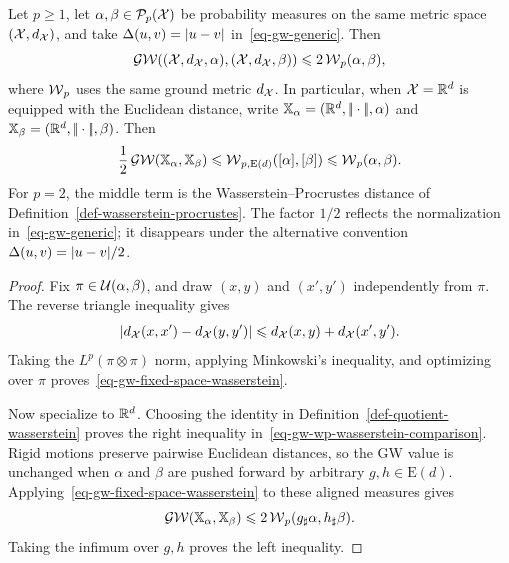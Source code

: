 \begin{prop}\label{prop-gw-wasserstein-procrustes-comparison}\label{prop-gw-controlled-by-wasserstein}\label{prop-gw-procrustes-upper-certificate}
	Let $p\geq1$, let $\alpha,\beta\in\mathcal{P}_p(\mathcal{X})$ be probability measures on the same metric space $(\mathcal{X},d_{\mathcal{X}})$, and take $\Delta(u,v)=|u-v|$ in~\eqref{eq-gw-generic}. Then
	\begin{equation}\label{eq-gw-fixed-space-wasserstein}
		\operatorname{\mathcal{GW}}((\mathcal{X},d_{\mathcal{X}},\alpha),(\mathcal{X},d_{\mathcal{X}},\beta))
		\leqslant
		2\operatorname{\mathcal{W}}_p(\alpha,\beta),
	\end{equation}
	where $\operatorname{\mathcal{W}}_p$ uses the same ground metric $d_{\mathcal{X}}$. In particular, when $\mathcal{X}=\mathbb{R}^d$ is equipped with the Euclidean distance, write $\mathbb{X}_\alpha=(\mathbb{R}^d,|\!| \cdot |\!|,\alpha)$ and $\mathbb{X}_\beta=(\mathbb{R}^d,|\!| \cdot |\!|,\beta)$. Then
	\begin{equation}\label{eq-gw-wp-wasserstein-comparison}
		\frac12\operatorname{\mathcal{GW}}(\mathbb{X}_\alpha,\mathbb{X}_\beta)
		\leqslant
		\operatorname{\mathcal{W}}_{p,\mathrm E(d)}([\alpha],[\beta])
		\leqslant
		\operatorname{\mathcal{W}}_p(\alpha,\beta).
	\end{equation}
	For $p=2$, the middle term is the Wasserstein--Procrustes distance of Definition~\ref{def-wasserstein-procrustes}. The factor $1/2$ reflects the normalization in~\eqref{eq-gw-generic}; it disappears under the alternative convention $\Delta(u,v)=|u-v|/2$.
\end{prop}
\begin{proof}
	Fix $\pi\in\mathcal{U}(\alpha,\beta)$, and draw $(x,y)$ and $(x',y')$ independently from $\pi$. The reverse triangle inequality gives
	\[
		\left\lvert d_{\mathcal{X}}(x,x')-d_{\mathcal{X}}(y,y')\right\rvert
		\leqslant
		d_{\mathcal{X}}(x,y)+d_{\mathcal{X}}(x',y').
	\]
	Taking the $L^p(\pi\otimes\pi)$ norm, applying Minkowski's inequality, and optimizing over $\pi$ proves~\eqref{eq-gw-fixed-space-wasserstein}.

	Now specialize to $\mathbb{R}^d$. Choosing the identity in Definition~\ref{def-quotient-wasserstein} proves the right inequality in~\eqref{eq-gw-wp-wasserstein-comparison}. Rigid motions preserve pairwise Euclidean distances, so the GW value is unchanged when $\alpha$ and $\beta$ are pushed forward by arbitrary $g,h\in\mathrm E(d)$. Applying~\eqref{eq-gw-fixed-space-wasserstein} to these aligned measures gives
	\[
		\operatorname{\mathcal{GW}}(\mathbb{X}_\alpha,\mathbb{X}_\beta)
		\leqslant
		2\operatorname{\mathcal{W}}_p(g_\sharp\alpha,h_\sharp\beta).
	\]
	Taking the infimum over $g,h$ proves the left inequality.
\end{proof}

